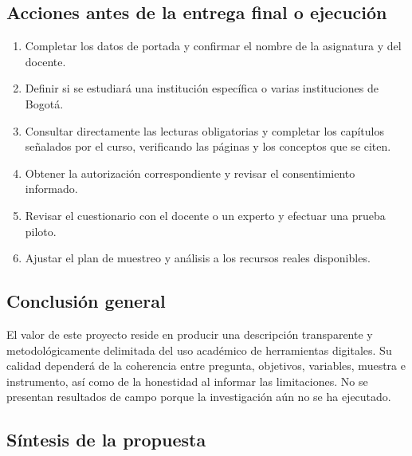 \subsection{Acciones antes de la entrega final o ejecución}

\begin{enumerate}
    \item Completar los datos de portada y confirmar el nombre de la asignatura y del docente.
    \item Definir si se estudiará una institución específica o varias instituciones de Bogotá.
    \item Consultar directamente las lecturas obligatorias y completar los capítulos señalados por el curso, verificando las páginas y los conceptos que se citen.
    \item Obtener la autorización correspondiente y revisar el consentimiento informado.
    \item Revisar el cuestionario con el docente o un experto y efectuar una prueba piloto.
    \item Ajustar el plan de muestreo y análisis a los recursos reales disponibles.
\end{enumerate}

\subsection{Conclusión general}

El valor de este proyecto reside en producir una descripción transparente y metodológicamente delimitada del uso académico de herramientas digitales. Su calidad dependerá de la coherencia entre pregunta, objetivos, variables, muestra e instrumento, así como de la honestidad al informar las limitaciones. No se presentan resultados de campo porque la investigación aún no se ha ejecutado.

\subsection{Síntesis de la propuesta}

